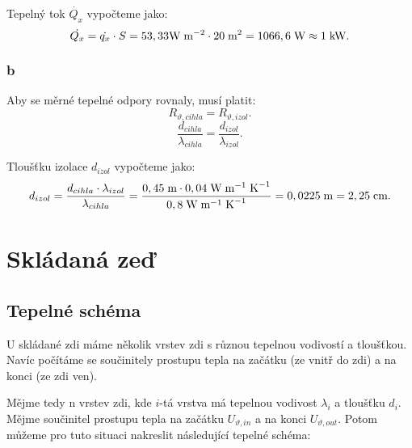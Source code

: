 \documentclass{article}
\begin{document}
Tepelný tok $\dot{Q_x}$ vypočteme jako:
$$
    \dot{Q_x} = \dot{q_x} \cdot S = 53,33 \textrm{W} \; \textrm{m}^{-2} \cdot 20 \; \textrm{m}^{\textrm{2}} = 1066,6 \; \textrm{W} \approx 1 \; \textrm{kW}.
$$

\subsubsection{b}
Aby se měrné tepelné odpory rovnaly, musí platit:
$$
    R_{\vartheta,cihla} = R_{\vartheta,izol}.
$$
$$
    \frac{d_{cihla}}{\lambda_{cihla}} = \frac{d_{izol}}{\lambda_{izol}}.
$$

Tloušťku izolace $d_{izol}$ vypočteme jako:
$$
    d_{izol} = \frac{d_{cihla} \cdot \lambda_{izol}}{\lambda_{cihla}} = \frac{0,45 \; \textrm{m} \cdot 0,04 \; \textrm{W} \; \textrm{m}^{-1} \; \textrm{K}^{-1}}{0,8 \; \textrm{W} \; \textrm{m}^{-1} \; \textrm{K}^{-1}} = 0,0225 \; \textrm{m} = 2,25 \; \textrm{cm}.
$$

\newpage



\section{ Skládaná zeď \spicy \spicy}


\subsection{Tepelné schéma}
U skládané zdi máme několik vrstev zdi s různou tepelnou vodivostí a tloušťkou. Navíc počítáme se součinitely prostupu tepla na začátku (ze vnitř do zdi) a na konci (ze zdi ven).

Mějme tedy n vrstev zdi, kde $i$-tá vrstva má tepelnou vodivost $\lambda_i$ a tloušťku $d_i$. Mějme součinitel prostupu tepla na začátku $U_{\vartheta,in}$ a na konci $U_{\vartheta,out}$. Potom můžeme pro tuto situaci nakreslit následující tepelné schéma:

\begin{center}
\end{center}
\end{document}
